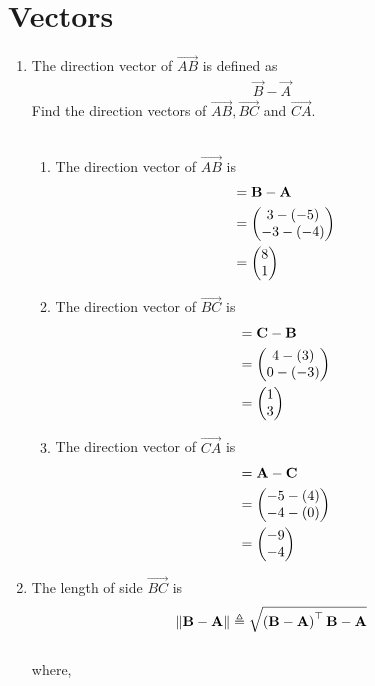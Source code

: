 \documentclass[10pt]{book}
\begin{document}
\section{Vectors}
\begin{enumerate}[label=\thesection.\arabic*.,ref=\thesection.\theenumi]
\item The direction vector of $\vec{AB}$ is defined as
\begin{align}
    \vec{B}-
    \vec{A}
\end{align} 
 Find the direction vectors of $\vec{AB}, \vec{BC}$ and $\vec{CA}$.\\
\solution\\
\begin{enumerate}
\item The direction vector of $\vec{AB}$ is
\begin{align}
    &= \vec{B}- \vec{A}\\ &= \myvec{ 3 - (-5)\\ -3 -(-4)}\\ &= \myvec{ 8 \\ 1}
    \label{eq:geo-dir-vec-ab}
\end{align}
\item The direction vector of $\vec{BC}$ is
\begin{align}
    &= \vec{C}- \vec{B}\\ &= \myvec{ 4 - (3)\\ 0 -(-3)}\\ &=\myvec{ 1 \\ 3}
    \label{eq:geo-dir-vec-bc}
\end{align}
\item The direction vector of $\vec{CA}$ is
\begin{align}
    &= \vec{A}- \vec{C}\\ &= \myvec{ -5 - (4)\\ -4 -(0)}\\ &=\myvec{ -9 \\ -4}
    \label{eq:geo-dir-vec-ca}
\end{align}
\end{enumerate}
\item The length of side $\vec{BC}$ is
\begin{align}
\left\lVert\mathbf{B}-\mathbf{A}\right\rVert \triangleq \sqrt{\left(\mathbf{B}-\mathbf{A}\right)^{\top}{\mathbf{B}-\mathbf{A}}}
\end{align}\\
where,
\begin{align}
\begin{split}

\end{split}
\end{align}
\end{enumerate}
\end{document}
